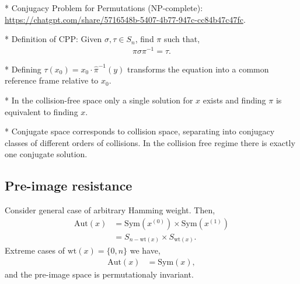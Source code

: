 \documentclass[twocolumn, aps, amsmath, amssymb, nofootinbib, superscriptaddress, longbibliography, doublefloatfix, table-of-contents, eqsecnum, rmp]{revtex4-2}
\def\selfbraid#1#2#3{\langle#1\rangle_{#2}^{#3}}
\def\symbraid#1{\langle#1\rangle_{\pi}^{\pi^{-1}}}
\begin{document}
* Conjugacy Problem for Permutations (NP-complete): \url{https://chatgpt.com/share/5716548b-5407-4b77-947c-cc84b47c47fc}.

* Definition of CPP: Given $\sigma,\tau\in S_n$, find $\pi$ such that,
\begin{align}
	\pi\sigma\pi^{-1} = \tau.	
\end{align}

* Defining $\tau(x_0) = x_0 \cdot \hat\pi^{-1}(y)$ transforms the equation into a common reference frame relative to $x_0$.

* In the collision-free space only a single solution for $x$ exists and finding $\pi$ is equivalent to finding $x$.

* Conjugate space corresponds to collision space, separating into conjugacy classes of different orders of collisions. In the collision free regime there is exactly one conjugate solution.






\subsection{Pre-image resistance}

Consider general case of arbitrary Hamming weight. Then,
\begin{align}
	\mathrm{Aut}(x) &= \mathrm{Sym}(x^{(0)}) \times \mathrm{Sym}(x^{(1)}) \nonumber\\
	&= S_{n-\mathrm{wt}(x)}\times S_{\mathrm{wt}(x)}.
\end{align}
Extreme cases of $\mathrm{wt}(x)=\{0,n\}$ we have,
\begin{align}
	\mathrm{Aut}(x) &= \mathrm{Sym}(x),
\end{align}
and the pre-image space is permutationaly invariant.
\end{document}
